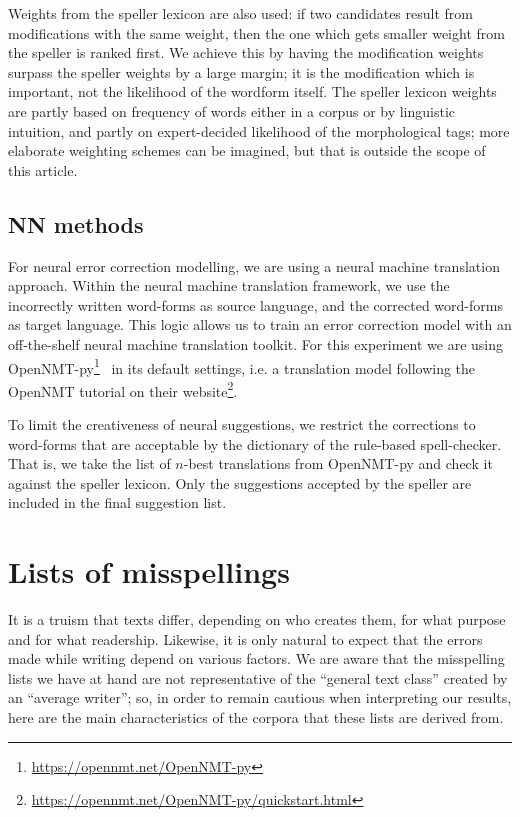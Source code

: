 \documentclass{flammie}
\begin{document}
Weights from the speller lexicon are also used: if two candidates result from
modifications with the same weight, then the one which gets smaller weight from
the speller is ranked first. We achieve this by having the modification weights
surpass the speller weights by a large margin; it is the modification which is
important, not the likelihood of the wordform itself.  The speller lexicon
weights are partly based on frequency of words either in a corpus or by
linguistic intuition, and partly on expert-decided likelihood of the
morphological tags; more elaborate weighting schemes can be imagined, but that
is outside the scope of this article.


\subsection{NN methods}

For neural error correction modelling, we are using a neural machine translation
approach. Within the neural machine translation framework, we use the
incorrectly written word-forms as source language, and the corrected word-forms
as target language. This logic allows us to train an error correction model with
an off-the-shelf neural machine translation toolkit.  For this experiment we are
using OpenNMT-py\footnote{\url{https://opennmt.net/OpenNMT-py}}~\cite{opennmt}
in its default settings, i.e. a translation model following the OpenNMT tutorial
on their website\footnote{\url{https://opennmt.net/OpenNMT-py/quickstart.html}}.

To limit the creativeness of neural suggestions, we restrict the corrections to
word-forms that are acceptable by the dictionary of the rule-based
spell-checker. That is, we take the list of \(n\)-best translations from
OpenNMT-py and check it against the speller lexicon. Only the suggestions
accepted by the speller are included in the final suggestion list.


\section{Lists of misspellings}

It is a truism that texts differ, depending on who creates them, for what
purpose and for what readership. Likewise, it is only natural to expect that the
errors made while writing depend on various factors. We are aware that the
misspelling lists we have at hand are not representative of the ``general text
class'' created by an ``average writer''; so, in order to remain cautious when
interpreting our results, here are the main characteristics of the  corpora that
these lists are derived from.
\end{document}
